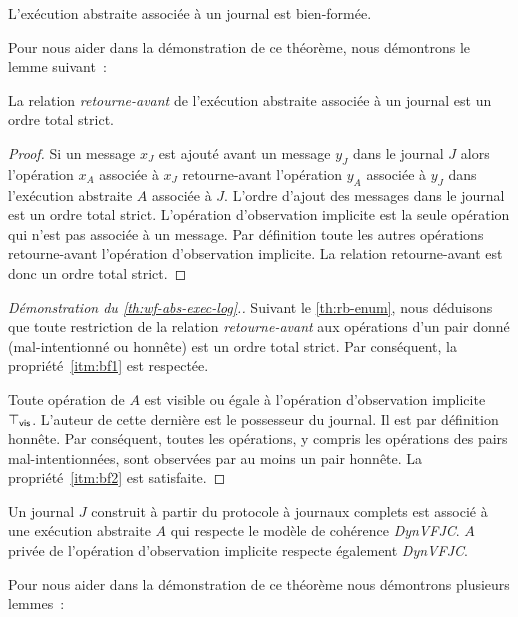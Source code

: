 \begin{theorem}\label{th:wf-abs-exec-log}
L'exécution abstraite associée à un journal est bien-formée.
\end{theorem}

Pour nous aider dans la démonstration de ce théorème, nous démontrons le lemme suivant~:

\begin{lemma}\label{th:rb-enum}
La relation \emph{retourne-avant} de l'exécution abstraite associée à un journal est un ordre total strict.
\end{lemma}
\begin{proof}
Si un message $x_J$ est ajouté avant un message $y_J$ dans le journal $J$ alors l'opération $x_A$ associée à $x_J$ retourne-avant l'opération $y_A$ associée à $y_J$ dans l'exécution abstraite $A$ associée à $J$.
L'ordre d'ajout des messages dans le journal est un ordre total strict.
L'opération d'observation implicite est la seule opération qui n'est pas associée à un message.
Par définition toute les autres opérations retourne-avant l'opération d'observation implicite.
La relation retourne-avant est donc un ordre total strict.
\end{proof}

\begin{proof}[Démonstration du \autoref{th:wf-abs-exec-log}.]
Suivant le \autoref{th:rb-enum}, nous déduisons que toute restriction de la relation \emph{retourne-avant} aux opérations d'un pair donné (mal-intentionné ou honnête) est un ordre total strict.
Par conséquent, la propriété~\ref{itm:bf1} est respectée.

Toute opération de $A$ est visible ou égale à l'opération d'observation implicite $\top_{\operatorname{\mathsf{vis}}}$.
L'auteur de cette dernière est le possesseur du journal.
Il est par définition honnête.
Par conséquent, toutes les opérations, y compris les opérations des pairs mal-intentionnées, sont observées par au moins un pair honnête.
La propriété~\ref{itm:bf2} est satisfaite.
\end{proof}


\begin{theorem}\label{th:abs-exec-full-log-consistency}
Un journal $J$ construit à partir du protocole à journaux complets est associé à une exécution abstraite $A$ qui respecte le modèle de cohérence \emph{DynVFJC}.
$A$ privée de l'opération d'observation implicite respecte également \emph{DynVFJC}.
\end{theorem}

Pour nous aider dans la démonstration de ce théorème nous démontrons plusieurs lemmes~:


